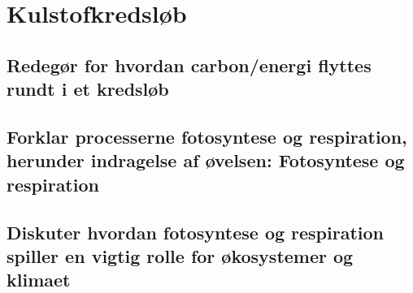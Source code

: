 \newpage
\section{Kulstofkredsløb}
\subsection{Redegør for hvordan carbon/energi flyttes rundt i et kredsløb}
\subsection{Forklar processerne fotosyntese og respiration, herunder indragelse af øvelsen: Fotosyntese og respiration}
\subsection{Diskuter hvordan fotosyntese og respiration spiller en vigtig rolle for økosystemer og klimaet}